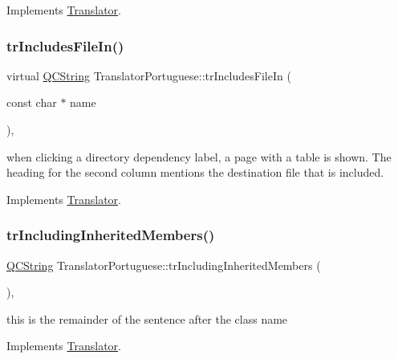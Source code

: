 Implements \mbox{\hyperlink{class_translator}{Translator}}.

\mbox{\label{class_translator_portuguese_a59aadd4aa0ee665711eff9a0bad836d3}} 
\subsubsection{\texorpdfstring{trIncludesFileIn()}{trIncludesFileIn()}}
{\footnotesize\ttfamily virtual \mbox{\hyperlink{class_q_c_string}{Q\+C\+String}} Translator\+Portuguese\+::tr\+Includes\+File\+In (\begin{DoxyParamCaption}\item[{const char $\ast$}]{name }\end{DoxyParamCaption})\hspace{0.3cm}{\ttfamily [inline]}, {\ttfamily [virtual]}}

when clicking a directory dependency label, a page with a table is shown. The heading for the second column mentions the destination file that is included. 

Implements \mbox{\hyperlink{class_translator}{Translator}}.

\mbox{\label{class_translator_portuguese_ad018c47a11432b7f0e47ca71c8038e8a}} 
\subsubsection{\texorpdfstring{trIncludingInheritedMembers()}{trIncludingInheritedMembers()}}
{\footnotesize\ttfamily \mbox{\hyperlink{class_q_c_string}{Q\+C\+String}} Translator\+Portuguese\+::tr\+Including\+Inherited\+Members (\begin{DoxyParamCaption}{ }\end{DoxyParamCaption})\hspace{0.3cm}{\ttfamily [inline]}, {\ttfamily [virtual]}}

this is the remainder of the sentence after the class name 

Implements \mbox{\hyperlink{class_translator}{Translator}}.

